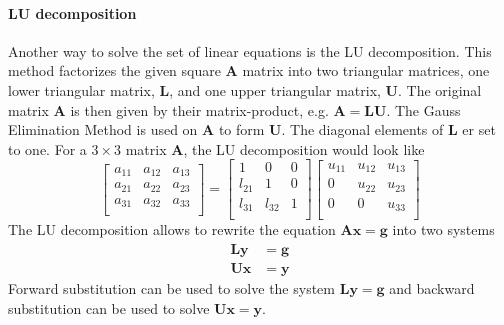 \documentclass[%
oneside,                 %
final,                   %
10pt]{article}
\begin{document}
\paragraph{LU decomposition}
Another way to solve the set of linear equations is the LU decomposition.
This method factorizes the given square $\mathbf{A}$ matrix into two triangular matrices, one lower triangular matrix, $ \mathbf{L}$, and one upper triangular matrix, $\mathbf{U}$.
The original matrix $\mathbf{A}$ is then given by their matrix-product, e.g. $ \mathbf{A}= \mathbf{L} \mathbf{U}$.
The Gauss Elimination Method is used on $\mathbf{A}$ to form $\mathbf{U}$.
The diagonal elements of $\mathbf{L}$ er set to one. For a $3 \times 3$ matrix $\mathbf{A}$, the LU decomposition would look like
\[
     \begin{bmatrix}
                           a_{11}	& a_{12} & a_{13} \\
                           a_{21} & a_{22} & a_{23}  \\
                           a_{31} & a_{32} & a_{33}  \\
                      \end{bmatrix}
  =\begin{bmatrix}
                           1		& 0 & 0 \\
                           l_{21} & 1 & 0  \\
                           l_{31} & l_{32} & 1  \\
                      \end{bmatrix}
   \begin{bmatrix}
                           u_{11}& u_{12} & u_{13} \\
                           0 		& u_{22} & u_{23}  \\
                           0 		& 0 & u_{33}  \\
                      \end{bmatrix}
\]
The LU decomposition allows to rewrite the equation $\mathbf{Ax} = \mathbf{g}$ into two systems
\begin{equation*}
\begin{aligned}
\mathbf{Ly} &= \mathbf{g} \\
\mathbf{Ux} &= \mathbf{y}
\end{aligned}
\end{equation*}
Forward substitution can be used to solve the system $\mathbf{Ly} = \mathbf{g}$ and backward substitution can be used to solve $\mathbf{Ux} = \mathbf{y}$.
\end{document}
